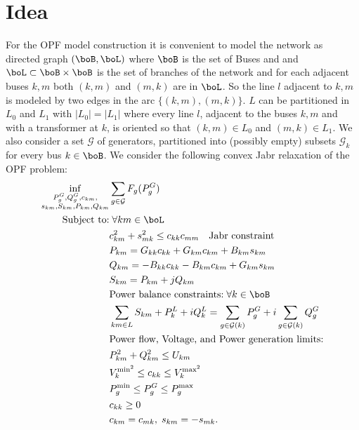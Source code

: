 \documentclass[11pt,a4paper,oneside,openany]{book}
\numberwithin{definition}{section}
\numberwithin{theorem}{section}
\numberwithin{problem}{section}
\begin{document}
\tableofcontents

\newpage




\section{Idea}



For the OPF model construction it is convenient to model the network as directed graph
$(\boB,\boL)$ where $\boB$ is the set of Buses and and $\boL \subset \boB \times \boB$ is the 
set of branches of the network and for each adjacent buses $k,m$ both $(k,m)$ and $(m,k)$ are
in $\boL$. So the line $l$ adjacent to $k,m$ is modeled by two edges in the arc $\{(k,m),(m,k)\}$.
$L$ can be partitioned in $L_0$ and $L_1$ with $|L_0|=|L_1|$ where every line $l$, adjacent 
to the buses $k,m$ and with a transformer at $k$, is oriented so that $(k,m) \in L_0$ and 
$(m,k) \in L_1$. We also consider a set $\mathcal{G}$ of generators, partitioned into 
(possibly empty) subsets $\mathcal{G}_k$ for every bus $k \in \boB$.
We consider the following convex Jabr relaxation of the OPF problem:
\begin{align}
  \label{Jabr equality model}
  \inf_{\substack{P^G_g, Q^G_g, c_{km}, \\ s_{km}, S_{km}, P_{km}, Q_{km}}} & \sum_{g \in \mathcal{G}}{F_g(P_g^G)} \\
  \text{Subject to:} & \; \forall km \in \boL \nonumber \\
  & c_{km}^2 + s_{mk}^2 \leq c_{kk}c_{mm} \quad \text{Jabr constraint} \label{Jabr constraint}\\
  & P_{km} = G_{kk}c_{kk}+G_{km}c_{km}+B_{km}s_{km} \label{c to P} \\
  & Q_{km} = -B_{kk}c_{kk}-B_{km}c_{km}+G_{km}s_{km} \label{c to Q}\\
  & S_{km} = P_{km} + jQ_{km} \label{PQ to S}\\
  & \text{Power balance constraints:}\; \forall k \in \boB\nonumber \\
  & \sum_{km \in L}S_{km}+P_k^L+iQ_k^L = \sum_{g \in \mathcal{G}(k)}{P_g^G} + i\sum_{g \in \mathcal{G}(k)}{Q_g^G} \label{Power Flow Constraint J}\\
  & \text{Power flow, Voltage, and Power generation limits:} \nonumber \\
  & P_{km}^2 + Q_{km}^2 \leq U_{km} \label{Power Flow Magnitude Constraint J}\\
  & V_k^{\text{min}^2} \leq c_{kk} \leq V_k^{\text{max}^2} \label{Voltage Magnitude Constraint J} \\
  & P_g^{\text{min}} \leq P_g^G \leq P_g^{\text{max}}\label{Power generation Magnitude Constraint J} \\
  & c_{kk} \geq 0 \; \\ 
  & c_{km} = c_{mk}, \;s_{km} = - s_{mk}.
  \end{align}
\end{document}
